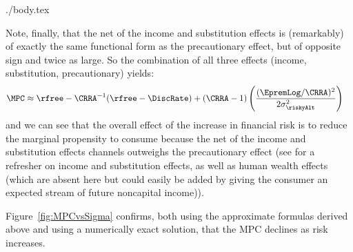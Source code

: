\documentclass{handout}
\begin{document}
\begin{verbatimwrite}{./body.tex}
{Note, finally, that the net of the income and substitution effects is (remarkably) of exactly the same functional
form as the precautionary effect, but of opposite sign and twice as large.  So the combination of all 
three effects (income, substitution, precautionary) yields:
\begin{equation}\begin{gathered}\begin{aligned}
        \MPC & \approx  \rfree-\CRRA^{-1}(\rfree-\DiscRate)+ (\CRRA-1)\left(\frac{(\EpremLog/\CRRA)^{2}}{2 \sigma_{\riskyAlt}^{2}}\right)
\end{aligned}\end{gathered}\end{equation}
and we can see that the overall effect of the increase in financial
risk is to reduce the marginal propensity to consume because the net
of the income and substitution effects channels outweighs the precautionary effect (see
 for a refresher on income and
substitution effects, as well as human wealth effects (which are
absent here but could easily be added by giving the consumer an
expected stream of future noncapital income)).

Figure~\ref{fig:MPCvsSigma} confirms, both using the approximate formulas
derived above and using a numerically exact solution, that the MPC declines
as risk increases.  

} %




\end{verbatimwrite}
\end{document}
